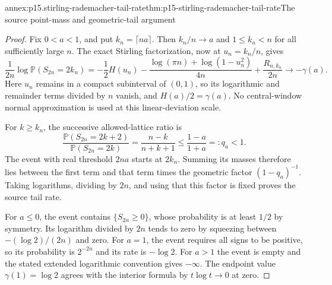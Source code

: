 \begin{annexitem}{annex:p15.stirling-rademacher-tail-rate}{thm:p15-stirling-rademacher-tail-rate}{The source point-mass and geometric-tail argument}
\begin{proof}
Fix \(0<a<1\), and put \(k_n=\lceil na\rceil\).
Then \(k_n/n\to a\) and \(1\leq k_n<n\) for all
sufficiently large \(n\).
The exact Stirling factorization, now at \(u_n=k_n/n\),
gives
\[
 \frac1{2n}\log\mathbb P(S_{2n}=2k_n)
 =-\frac12H(u_n)
  -\frac{\log(\pi n)+\log(1-u_n^2)}{4n}
  +\frac{R_{n,k_n}}{2n}
 \longrightarrow-\gamma(a).
\]
Here \(u_n\) remains in a compact subinterval of \((0,1)\),
so its logarithmic and remainder terms divided by \(n\)
vanish, and \(H(a)/2=\gamma(a)\).
No central-window normal approximation is used at this
linear-deviation scale.

For \(k\geq k_n\), the successive allowed-lattice ratio is
\[
 \frac{\mathbb P(S_{2n}=2k+2)}
      {\mathbb P(S_{2n}=2k)}
    =\frac{n-k}{n+k+1}
    \leq\frac{1-a}{1+a}=:q_a<1.
\]
The event with real threshold \(2na\) starts at \(2k_n\).
Summing its masses therefore lies between the first term
and that term times the geometric factor \((1-q_a)^{-1}\).
Taking logarithms, dividing by \(2n\), and using that this
factor is fixed proves the source tail rate.

For \(a\leq0\), the event contains \(\{S_{2n}\geq0\}\),
whose probability is at least \(1/2\) by symmetry.
Its logarithm divided by \(2n\) tends to zero by squeezing
between \(-(\log2)/(2n)\) and zero.
For \(a=1\), the event requires all signs to be positive,
so its probability is \(2^{-2n}\) and its rate is
\(-\log2\). For \(a>1\) the event is empty and the
stated extended logarithmic convention gives \(-\infty\).
The endpoint value \(\gamma(1)=\log2\) agrees with the
interior formula by \(t\log t\to0\) at zero.
\end{proof}
\end{annexitem}


